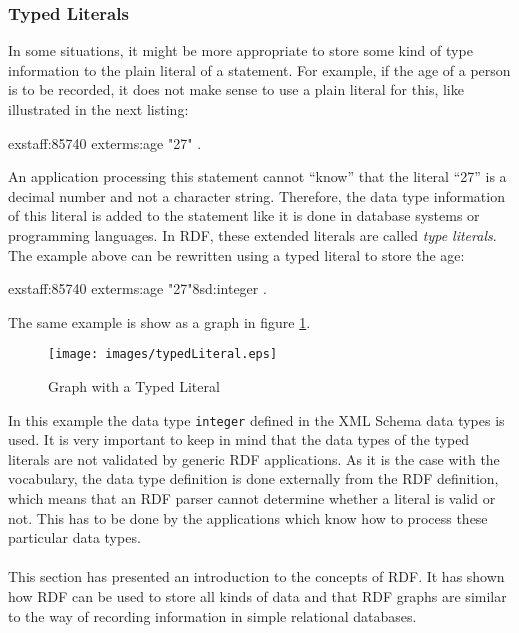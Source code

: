 \documentclass[11pt,a4paper,headsepline, bibtotoc]{scrreprt}
\begin{document}
\subsubsection{Typed Literals}
In some situations, it might be more appropriate to store some kind of type information to the plain literal of a statement. For example, if the age of a person is to be recorded, it does not make sense to use a plain literal for this, like illustrated in the next listing:
\begin{blank}
exstaff:85740   exterms:age     "27" .
\end{blank}
An application processing this statement cannot ``know'' that the literal ``27'' is a decimal number and not a character string. Therefore, the data type information of this literal is added to the statement like it is done in database systems or programming languages. In RDF, these extended literals are called \textit{type literals}. The example above can be rewritten using a typed literal to store the age:
\begin{blank}
exstaff:85740   exterms:age     "27"^^xsd:integer .
\end{blank}
The same example is show as a graph in figure \ref{typedLiteral}.
\begin{figure}[H]
        \caption{Graph with a Typed Literal}
        \label{typedLiteral}
        \texttt{[image: images/typedLiteral.eps]}
\end{figure}
In this example the data type \texttt{integer} defined in the XML Schema \cite{XML:Schema} data types is used. It is very important to keep in mind that the data types of the typed literals are not validated by generic RDF applications. As it is the case with the vocabulary, the data type definition is done externally from the RDF definition, which means that an RDF parser cannot determine whether a literal is valid or not. This has to be done by the applications which know how to process these particular data types.\\ \\
This section has presented an introduction to the concepts of RDF. It has shown how RDF can be used to store all kinds of data and that RDF graphs are similar to the way of recording information in simple relational databases.
\end{document}
